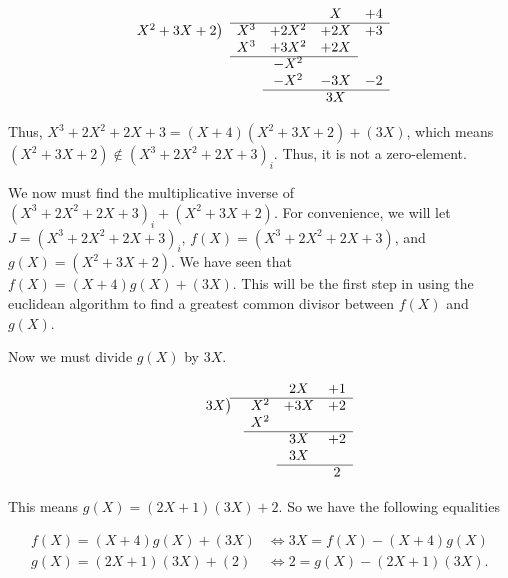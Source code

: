 \documentclass[12pt, a4paper]{article}
\begin{document}
\vspace{4mm}

\[
\begin{array}{m{3.5em}ccccc}
&       &         &    & X & +4\\
\cline{3-6}
\multicolumn{2}{l}{X^2+3X+2\big)}
   &  X^3          & +2X^2 & +2X         & +3 \\
&   &  X^3          & +3X^2 & +2X          &  \\
\cline{3-5}
&  &    &  -X^2  &                          &  \\
&  &    &  -X^2  & -3X & -2 \\
\cline{4-6}
&    &   &  &  3X &   \\
\end{array}
\]

\vspace{4mm}

Thus, $X^3+2X^2+2X+3=(X+4)(X^2+3X+2)+(3X)$, which means $(X^2+3X+2)\notin(X^3+2X^2+2X+3)_i$. Thus, it is not a zero-element.

\newpage

\noindent We now must find the multiplicative inverse of $(X^3+2X^2+2X+3)_i+(X^2+3X+2)$. For convenience, we will let $J=(X^3+2X^2+2X+3)_i$, $f(X)=(X^3+2X^2+2X+3)$, and $g(X)=(X^2+3X+2)$. We have seen that  $f(X)=(X+4)g(X)+(3X)$. This will be the first step in using the euclidean algorithm to find a greatest common divisor between $f(X)$ and $g(X)$.\par
Now we must divide $g(X)$ by $3X$.

\vspace{4mm}

\[
\begin{array}{m{3.5em}cccc}
&&& 2X & +1\\
\cline{2-5}
\multicolumn{2}{l}{\hspace{8mm}3X\big)}
& X^2 & +3X  & +2 \\
&            & X^2 &          &  \\
\cline{3-5}
&    &    &  3X                        & +2 \\
&    &    & 3X &  \\
\cline{4-5}
&   &  &   & 2  \\
\end{array}
\]

\vspace{4mm}

This means $g(X)=(2X+1)(3X)+2$. So we have the following equalities

     \begin{equation*}
        \begin{split}
            f(X)=(X+4)g(X)+(3X) &\Leftrightarrow 3X=f(X)-(X+4)g(X) \\
            g(X)=(2X+1)(3X)+(2) &\Leftrightarrow 2=g(X)-(2X+1)(3X).
        \end{split}
    \end{equation*}
    
\end{document}
